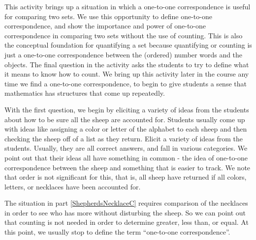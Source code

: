 \documentclass[handout]{ximera}
\begin{document}
\newpage
\begin{instructorNotes}

This activity brings up a situation in which a one-to-one correspondence is useful for comparing two sets.  We use this opportunity to define one-to-one correspondence, and show the importance and power of one-to-one correspondence in comparing two sets without the use of counting. 
This is also the conceptual foundation for quantifying a set because quantifying or counting is just a one-to-one correspondence between the (ordered) number words and the objects.  
The final question in the activity asks the students to try to define what it means to know how to count. We bring up this activity later in the course any time we find a one-to-one correspondence, to begin to give students a sense that mathematics has structures that come up repeatedly.


With the first question, we begin by eliciting a variety of ideas from the students about how to be sure all the sheep are accounted for.  Students usually come up with ideas like assigning a color or letter of the alphabet to each sheep and then checking the sheep off of a list as they return.  Elicit a variety of ideas from the students. Usually, they are all correct answers, and fall in various categories.  We point out that their ideas all have something in common - the idea of one-to-one correspondence between the sheep and something that is easier to track.  We note that order is not significant for this, that is, all sheep have returned if all colors, letters, or necklaces have been accounted for.


The situation in part \ref{ShepherdsNecklaceC} requires comparison of the necklaces in order to see who has more without disturbing the sheep.  So we can point out that counting is not needed in order to determine greater, less than, or equal. At this point, we usually stop to define the term ``one-to-one correspondence''.




\end{instructorNotes}
\end{document}
